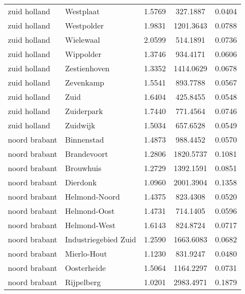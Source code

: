 \begin{longtable}{llccc}
	zuid holland  & Westplaat                        & 1.5769  & 327.1887  & 0.0404          \\
	zuid holland  & Westpolder                       & 1.9831  & 1201.3643 & 0.0788          \\
	zuid holland  & Wielewaal                        & 2.0599  & 514.1891  & 0.0736          \\
	zuid holland  & Wippolder                        & 1.3746  & 934.4171  & 0.0606          \\
	zuid holland  & Zestienhoven                     & 1.3352  & 1414.0629 & 0.0678          \\
	zuid holland  & Zevenkamp                        & 1.5541  & 893.7788  & 0.0567          \\
	zuid holland  & Zuid                             & 1.6404  & 425.8455  & 0.0548          \\
	zuid holland  & Zuiderpark                       & 1.7440  & 771.4564  & 0.0746          \\
	zuid holland  & Zuidwijk                         & 1.5034  & 657.6528  & 0.0549          \\
	noord brabant & Binnenstad                       & 1.4873  & 988.4452  & 0.0570          \\
	noord brabant & Brandevoort                      & 1.2806  & 1820.5737 & 0.1081          \\
	noord brabant & Brouwhuis                        & 1.2729  & 1392.1591 & 0.0851          \\
	noord brabant & Dierdonk                         & 1.0960  & 2001.3904 & 0.1358          \\
	noord brabant & Helmond-Noord                    & 1.4375  & 823.4308  & 0.0520          \\
	noord brabant & Helmond-Oost                     & 1.4731  & 714.1405  & 0.0596          \\
	noord brabant & Helmond-West                     & 1.6143  & 824.8724  & 0.0717          \\
	noord brabant & Industriegebied Zuid             & 1.2590  & 1663.6083 & 0.0682          \\
	noord brabant & Mierlo-Hout                      & 1.1230  & 831.9247  & 0.0480          \\
	noord brabant & Oosterheide                      & 1.5064  & 1164.2297 & 0.0731          \\
	noord brabant & Rijpelberg                       & 1.0201  & 2983.4971 & 0.1879          \\

\end{longtable}
